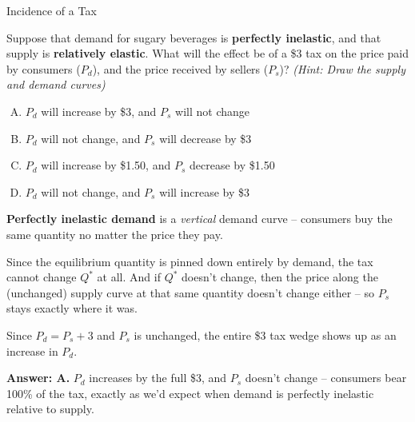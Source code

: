 \documentclass{beamer}
\begin{document}
\begin{frame}{Incidence of a Tax}


  Suppose that demand for sugary beverages is \textbf{perfectly inelastic}, and that supply is \textbf{relatively elastic}. What will the effect be of a \$3 tax on the price paid by consumers ($P_d$), and the price received by sellers ($P_s$)? \emph{(Hint: Draw the supply and demand curves)}

  \bigskip
  \begin{enumerate}[A)]
    \item $P_d$ will increase by \$3, and $P_s$ will not change
    \item $P_d$ will not change, and $P_s$ will decrease by \$3
    \item $P_d$ will increase by \$1.50, and $P_s$ decrease by \$1.50
    \item $P_d$ will not change, and $P_s$ will increase by \$3
  \end{enumerate}
\end{frame}

\begin{frame}


  \bigskip
  \textbf{Perfectly inelastic demand} is a \emph{vertical} demand curve -- consumers buy the same quantity no matter the price they pay.

  \bigskip
  Since the equilibrium quantity is pinned down entirely by demand, the tax cannot change $Q^*$ at all. And if $Q^*$ doesn't change, then the price along the (unchanged) supply curve at that same quantity doesn't change either -- so $P_s$ stays exactly where it was.

  \bigskip
  Since $P_d = P_s + 3$ and $P_s$ is unchanged, the entire \$3 tax wedge shows up as an increase in $P_d$.

  \bigskip
  \textbf{Answer: A.} $P_d$ increases by the full \$3, and $P_s$ doesn't change -- consumers bear 100\% of the tax, exactly as we'd expect when demand is perfectly inelastic relative to supply.
\end{frame}
\end{document}
